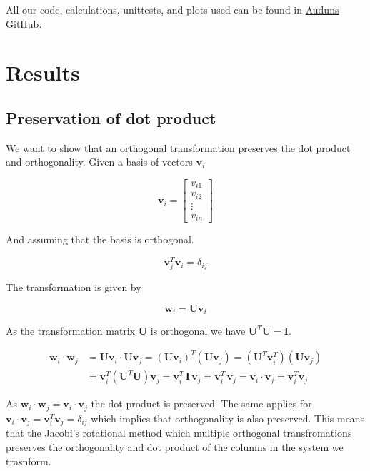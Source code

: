 \documentclass[a4paper, fontsize=11pt]{article}
\begin{document}
All our code, calculations, unittests, and plots used can be found in \href{https://github.com/auduntre/FYS4150/tree/master/Project%202}{Auduns GitHub}.

\section{Results}
\subsection{Preservation of dot product}
We want to show that an orthogonal transformation preserves the dot product and orthogonality. Given a basis of vectors $\textbf{v}_{i}$

\begin{equation}
\textbf{v}_{i}=
\begin{bmatrix}
v_{i1} \\
v_{i2} \\
\vdots \\
v_{in}
\end{bmatrix}
\end{equation}

And assuming that the basis is orthogonal.

\begin{equation}
\textbf{v}^{T}_{j} \textbf{v}_{i} = \delta_{ij}
\end{equation}

The transformation is given by

\begin{equation}
\textbf{w}_{i} = \textbf{U} \textbf{v}_{i}
\end{equation}

As the transformation matrix \textbf{U} is orthogonal we have $\textbf{U}^{T}\textbf{U} = \textbf{I}$.

\begin{align*}
\textbf{w}_{i} \cdot \textbf{w}_{j} & =\textbf{U} \textbf{v}_{i} \cdot \textbf{U} \textbf{v}_{j} = (\textbf{U}\textbf{v}_{i})^{T}(\textbf{U}\textbf{v}_{j})=(\textbf{U}^{T} \textbf{v}_{i}^{T})(\textbf{U}\textbf{v}_{j})\\
&= \textbf{v}_{i}^{T} (\textbf{U}^{T} \textbf{U}) \textbf{v}_{j}= \textbf{v}_{i}^{T} \, \textbf{I} \, \textbf{v}_{j} =  \textbf{v}_{i}^{T} \,  \textbf{v}_{j} = \textbf{v}_{i} \cdot \textbf{v}_{j} = \textbf{v}^T_{i} \textbf{v}_{j}
\end{align*}

As $\textbf{w}_{i} \cdot \textbf{w}_{j} = \textbf{v}_{i} \cdot \textbf{v}_{j}$ the dot product is preserved. The same applies for $\textbf{v}_{i} \cdot \textbf{v}_{j} = \textbf{v}^T_{i} \textbf{v}_{j} = \delta_{ij}$ which implies that orthogonality is also preserved. This means that the Jacobi's rotational method which multiple orthogonal transfromations preserves the orthogonality and dot product of the columns in the system we trasnform.
\end{document}
